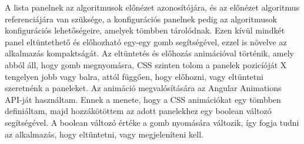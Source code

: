 A lista panelnek az algoritmusok előnézet azonosítójára, és az előnézet algoritmus referenciájára van szüksége, a konfigurációs panelnek pedig az algoritmusok konfigurációs lehetőségeire, amelyek tömbben tárolódnak. Ezen kívül mindkét panel eltüntethető és előhozható egy-egy gomb segítségével, ezzel is növelve az alkalmazás kompaktságát. Az eltüntetés és előhozás animációval történik, amely abból áll, hogy gomb megnyomásra, CSS szinten tolom a panelek pozicíóját X tengelyen jobb vagy balra, attól függően, hogy előhozni, vagy eltüntetni szeretnénk a paneleket. Az animáció megvalósítására az Angular Animations API-ját használtam. Ennek a menete, hogy a CSS animációkat egy tömbben definiáltam, majd hozzákötöttem az adott panelekhez egy boolean változó segítségével. A boolean változó értéke a gomb nyomására változik, így fogja tudni az alkalmazás, hogy eltüntetni, vagy megjeleníteni kell.
